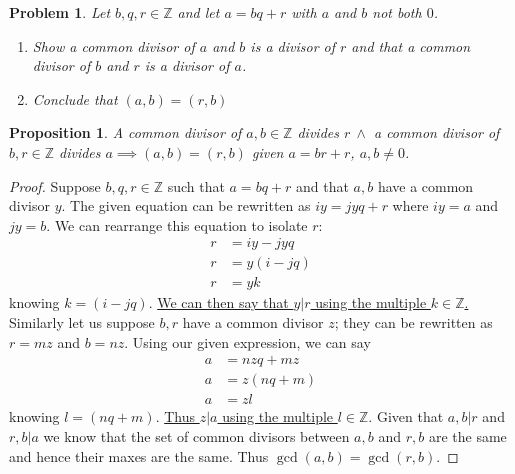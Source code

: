 \documentclass[12pt]{article}
\newtheorem*{prop}{Proposition}
\newtheorem{problem}{Problem}
\theoremstyle{remark}  %
\begin{document}
\setcounter{problem}{16}
    \begin{problem}
        Let $b,q,r\in \mathbb{Z}$ and let $a=bq+r$ with $a$ and $b$ not both $0$.
        \begin{enumerate}[label=(\alph*)]
            \item Show a common divisor of $a$ and $b$ is a divisor of $r$ and that a common divisor of $b$ and $r$ is a divisor of $a$.
            \item Conclude that $(a,b)=(r,b)$
        \end{enumerate}
    \end{problem}
    \begin{prop}
        A common divisor of $a,b\in\mathbb{Z}$ divides $r\ \land$ a common divisor of $b,r\in\mathbb{Z}$ divides $a\implies(a,b)=(r,b)$ given $a=br+r$, $a,b\neq0$.
    \end{prop}
    \begin{proof}
        Suppose $b,q,r\in\mathbb{Z}$ such that $a=bq+r$ and that $a,b$ have a common divisor $y$. The given equation can be rewritten as $iy=jyq+r$ where $iy=a$ and $jy=b$. We can rearrange this equation to isolate $r$: \begin{align*}
            r &= iy-jyq \\
            r &= y(i-jq) \\
            r &= yk
        \end{align*}
        knowing $k=(i-jq)$. \underline{We can then say that $y|r$ using the multiple $k\in\mathbb{Z}$.} Similarly let us suppose $b,r$ have a common divisor $z$; they can be rewritten as $r=mz$ and $b=nz$. Using our given expression, we can say
        \begin{align*}
            a &= nzq + mz \\
            a &= z(nq+m) \\
            a &= zl
        \end{align*}
        knowing $l=(nq+m)$. \underline{Thus $z|a$ using the multiple $l\in\mathbb{Z}$}. Given that $a,b|r$ and $r,b|a$ we know that the set of common divisors between $a,b$ and $r,b$ are the same and hence their maxes are the same. Thus $\gcd(a,b)=\gcd(r,b)$.
    \end{proof}
\vspace{.5em}
\end{document}
